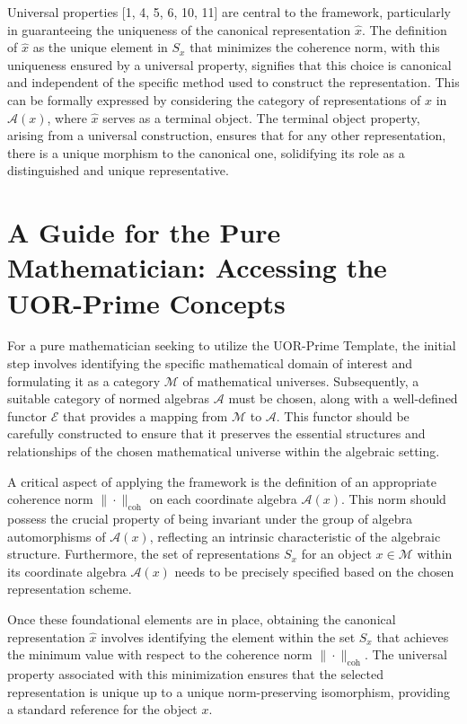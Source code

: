 \documentclass{article}
\begin{document}
Universal properties [1, 4, 5, 6, 10, 11] are central to the framework, particularly in guaranteeing the uniqueness of the canonical representation $\hat{x}$. The definition of $\hat{x}$ as the unique element in $S_x$ that minimizes the coherence norm, with this uniqueness ensured by a universal property, signifies that this choice is canonical and independent of the specific method used to construct the representation. This can be formally expressed by considering the category of representations of $x$ in $\mathcal{A}(x)$, where $\hat{x}$ serves as a terminal object. The terminal object property, arising from a universal construction, ensures that for any other representation, there is a unique morphism to the canonical one, solidifying its role as a distinguished and unique representative.

\section{A Guide for the Pure Mathematician: Accessing the UOR-Prime Concepts}

For a pure mathematician seeking to utilize the UOR-Prime Template, the initial step involves identifying the specific mathematical domain of interest and formulating it as a category $\mathcal{M}$ of mathematical universes. Subsequently, a suitable category of normed algebras $\mathcal{A}$ must be chosen, along with a well-defined functor $\mathcal{E}$ that provides a mapping from $\mathcal{M}$ to $\mathcal{A}$. This functor should be carefully constructed to ensure that it preserves the essential structures and relationships of the chosen mathematical universe within the algebraic setting.

A critical aspect of applying the framework is the definition of an appropriate coherence norm $\|\cdot\|_{\mathrm{coh}}$ on each coordinate algebra $\mathcal{A}(x)$. This norm should possess the crucial property of being invariant under the group of algebra automorphisms of $\mathcal{A}(x)$, reflecting an intrinsic characteristic of the algebraic structure. Furthermore, the set of representations $S_x$ for an object $x \in \mathcal{M}$ within its coordinate algebra $\mathcal{A}(x)$ needs to be precisely specified based on the chosen representation scheme.

Once these foundational elements are in place, obtaining the canonical representation $\hat{x}$ involves identifying the element within the set $S_x$ that achieves the minimum value with respect to the coherence norm $\|\cdot\|_{\mathrm{coh}}$. The universal property associated with this minimization ensures that the selected representation is unique up to a unique norm-preserving isomorphism, providing a standard reference for the object $x$.
\end{document}
